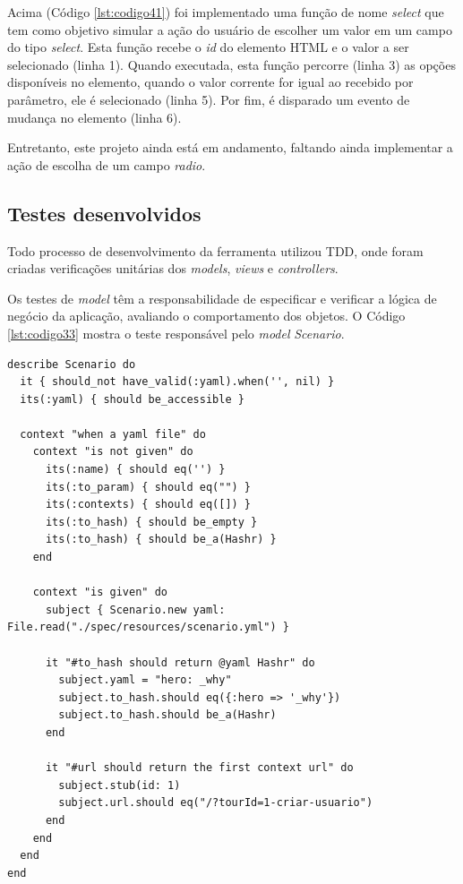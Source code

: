 Acima (Código \ref{lst:codigo41}) foi implementado uma função de nome \textit{select} que tem como objetivo simular a ação do usuário de escolher um valor em um campo do tipo \textit{select}. Esta função recebe o \textit{id} do elemento HTML e o valor a ser selecionado (linha 1). Quando executada, esta função percorre (linha 3) as opções disponíveis no elemento, quando o valor corrente for igual ao recebido por parâmetro, ele é selecionado (linha 5). Por fim, é disparado um evento de mudança no elemento (linha 6).

Entretanto, este projeto ainda está em andamento, faltando ainda implementar a ação de escolha de um campo \textit{radio}.
























\subsection{Testes desenvolvidos}

Todo processo de desenvolvimento da ferramenta utilizou TDD, onde foram criadas verificações unitárias dos \textit{models}, \textit{views} e \textit{controllers}.

\pagebreak

Os testes de \textit{model} têm a responsabilidade de especificar e verificar a lógica de negócio da aplicação, avaliando o comportamento dos objetos. O Código \ref{lst:codigo33} mostra o teste responsável pelo \textit{model} \textit{Scenario}.

{\singlespace
\begin{lstlisting}[caption=Teste unitário de \textit{model},label={lst:codigo33}]
describe Scenario do
  it { should_not have_valid(:yaml).when('', nil) }
  its(:yaml) { should be_accessible }

  context "when a yaml file" do
    context "is not given" do
      its(:name) { should eq('') }
      its(:to_param) { should eq("") }
      its(:contexts) { should eq([]) }
      its(:to_hash) { should be_empty }
      its(:to_hash) { should be_a(Hashr) }
    end

    context "is given" do
      subject { Scenario.new yaml: File.read("./spec/resources/scenario.yml") }

      it "#to_hash should return @yaml Hashr" do
        subject.yaml = "hero: _why"
        subject.to_hash.should eq({:hero => '_why'})
        subject.to_hash.should be_a(Hashr)
      end

      it "#url should return the first context url" do
        subject.stub(id: 1)
        subject.url.should eq("/?tourId=1-criar-usuario")
      end
    end
  end
end
\end{lstlisting}
}

